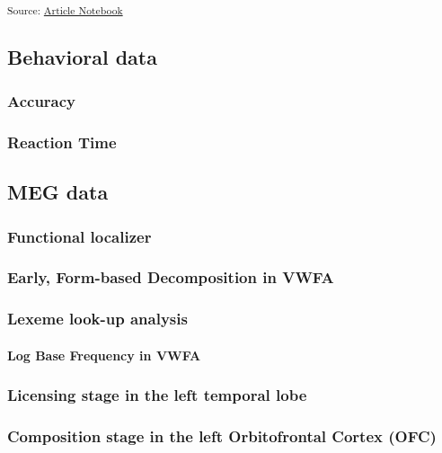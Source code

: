 \documentclass[
]{article}
\let\oldparagraph\paragraph
\renewcommand{\paragraph}[1]{\oldparagraph{#1}\mbox{}}
\begin{document}
\textsubscript{Source:
\href{https://SwarMoi.github.io/Moitra-et-al_SAVANT/index.qmd.html}{Article
Notebook}}

\subsection{Behavioral data}\label{behavioral-data}

\subsubsection{Accuracy}\label{accuracy}

\subsubsection{Reaction Time}\label{reaction-time}

\subsection{MEG data}\label{meg-data-1}

\subsubsection{Functional localizer}\label{functional-localizer}

\subsubsection{Early, Form-based Decomposition in
VWFA}\label{early-form-based-decomposition-in-vwfa}

\subsubsection{Lexeme look-up analysis}\label{lexeme-look-up-analysis}

\paragraph{Log Base Frequency in VWFA}\label{log-base-frequency-in-vwfa}

\subsubsection{Licensing stage in the left temporal
lobe}\label{licensing-stage-in-the-left-temporal-lobe}

\subsubsection{Composition stage in the left Orbitofrontal Cortex
(OFC)}\label{composition-stage-in-the-left-orbitofrontal-cortex-ofc}
\end{document}
